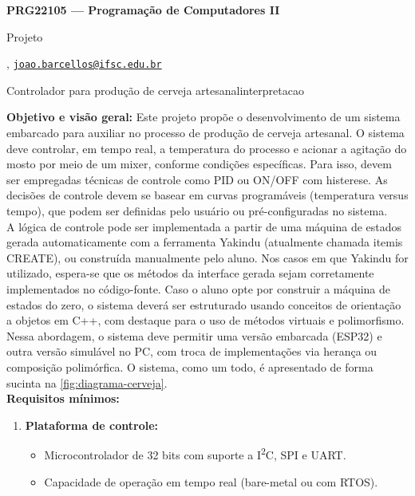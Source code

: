 





\begin{Large}
    \textbf{PRG22105 --- Programação de Computadores II}
    
    Projeto \hfill {}
\end{Large}

\vspace{1ex}
\textbf{} , \href{mailto:joao.barcellos@ifsc.edu.br}{\texttt{joao.barcellos@ifsc.edu.br}}\\
\textbf{}


\vspace{2ex}
\begin{problem}{Controlador para produção de cerveja artesanal}{interpretacao}

\textbf{Objetivo e visão geral:} Este projeto propõe o desenvolvimento de um sistema embarcado para auxiliar no processo de produção de cerveja artesanal. O sistema deve controlar, em tempo real, a temperatura do processo e acionar a agitação do mosto por meio de um mixer, conforme condições específicas. Para isso, devem ser empregadas técnicas de controle como PID ou ON/OFF com histerese. As decisões de controle devem se basear em curvas programáveis (temperatura versus tempo), que podem ser definidas pelo usuário ou pré-configuradas no sistema.\\ 

A lógica de controle pode ser implementada a partir de uma máquina de estados gerada automaticamente com a ferramenta Yakindu (atualmente chamada itemis CREATE), ou construída manualmente pelo aluno. Nos casos em que Yakindu for utilizado, espera-se que os métodos da interface gerada sejam corretamente implementados no código-fonte. Caso o aluno opte por construir a máquina de estados do zero, o sistema deverá ser estruturado usando conceitos de orientação a objetos em C++, com destaque para o uso de métodos virtuais e polimorfismo. Nessa abordagem, o sistema deve permitir uma versão embarcada (ESP32) e outra versão simulável no PC, com troca de implementações via herança ou composição polimórfica. O sistema, como um todo, é apresentado de forma sucinta na \autoref{fig:diagrama-cerveja}.\\

\vspace{1ex}
\textbf{Requisitos mínimos:}
\begin{enumerate}
    \item \textbf{Plataforma de controle:}
    \begin{itemize}
        \item Microcontrolador de 32 bits com suporte a I\textsuperscript{2}C, SPI e UART.
        \item Capacidade de operação em tempo real (bare-metal ou com RTOS).
    \end{itemize}


\end{enumerate}
\end{problem}
